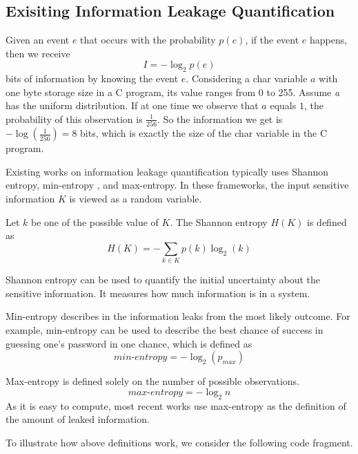 \subsection{Exisiting Information Leakage Quantification}
 
Given an event $e$ that occurs with the probability $p(e)$, if the event $e$ happens, 
then we receive
\begin{displaymath}
    I = - \log_2p(e)
\end{displaymath}
bits of information by knowing the event $e$.
Considering a char variable $a$ with one byte storage size in a C program, its value 
ranges from 0 to 255.  Assume
 \textit{a} has the uniform distribution. If at one time we observe that $a$
equals $1$, the probability of this observation is $\frac{1}{256}$. So the information we get is 
$-\log(\frac{1}{256}) = 8$ bits, which is exactly the size of the char variable in the C program.

Existing works on information leakage quantification typically uses Shannon entropy,  
min-entropy \cite{10.1007/978-3-642-00596-1_21}, and max-entropy.
In these frameworks, the input sensitive
information $K$ is viewed as a random variable. 

Let $k$ be one of the possible
value of $K$. The Shannon entropy $H(K)$ is defined as
\begin{displaymath}
    H(K) = - \sum_{k {\in} K}p(k)\log_2(k)
\end{displaymath}

Shannon entropy can be used to quantify the initial uncertainty about the sensitive
information. It measures how much information is in a system.

Min-entropy describes in the information leaks from the most likely outcome.
For example, min-entropy can be used to describe the best chance of success in guessing 
one's password in one chance, which is defined as 
\begin{displaymath}
    \mathit{min\text{-}entropy} = - \log_2(p_{max})
\end{displaymath}

Max-entropy is defined solely on the number of possible observations. 
\begin{displaymath}
    \mathit{max\text{-}entropy} = -\log_2{n}
\end{displaymath}
As it is easy to compute, most recent works use 
max-entropy as the definition of the amount of leaked information.

To illustrate how above definitions work, we consider the following
code fragment. 


